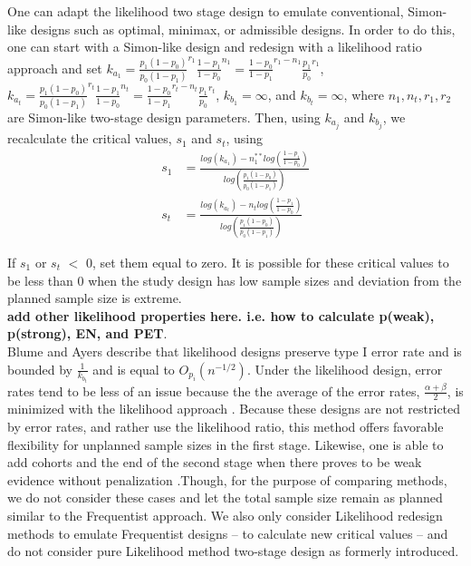 \documentclass[12pt]{report}\usepackage[]{graphicx}\usepackage[]{color}
\newlength{\li}\setlength{\li}{14.48pt}
\begin{document}
\indent One can adapt the likelihood two stage design to emulate conventional, Simon-like designs such as optimal, minimax, or admissible designs. In order to do this, one can start with a Simon-like design and redesign with a likelihood ratio approach and set $k_{a_1} = \frac{p_1(1-p_0)}{p_0(1-p_1)}^{r_1} \frac{1-p_1}{1-p_0}^{n_1} = \frac{1-p_0}{1-p_1}^{r_1-n_1}\frac{p_1}{p_0}^{r_1}$, $k_{a_t}  = \frac{p_1(1-p_0)}{p_0(1-p_1)}^{r_t} \frac{1-p_1}{1-p_0}^{n_t} = \frac{1-p_0}{1-p_1}^{r_t-n_t}\frac{p_1}{p_0}^{r_t}$, $k_{b_1} = \infty$, and $k_{b_t} = \infty$, where $n_1, n_t, r_1, r_2$ are Simon-like two-stage design parameters. Then, using $k_{a_j}$ and $k_{b_j}$, we recalculate the critical values, $s_1$ and $s_t$, using
\begin{equation*}
\begin{aligned}
s_1 &= \frac{log(k_{a_1}) - n_1^{\ast\ast} log(\frac{1-p_1}{1-p_0})}{log(\frac{p_1(1-p_0)}{p_0(1-p_1)})} \\
s_t &= \frac{log(k_{a_t}) - n_t log(\frac{1-p_1}{1-p_0})}{log(\frac{p_1(1-p_0)}{p_0(1-p_1)})}
\end{aligned}
\end{equation*}

If $s_1$ or $s_t$ $<$ 0, set them equal to zero. It is possible for these critical values to be less than 0 when the study design has low sample sizes and deviation from the planned sample size is extreme. \\
\textbf{add other likelihood properties here. i.e. how to calculate p(weak), p(strong), EN, and PET}. \\
\indent Blume and Ayers describe that likelihood designs preserve type I error rate and is bounded by $\frac{1}{k_{b_t}}$ and is equal to $O_{p_i}\left({n}^{-1/2}\right)$. Under the likelihood design, error rates tend to be less of an issue because the the average of the error rates, $\frac{\alpha + \beta}{2}$, is minimized with the likelihood approach \cite{Blume}. Because these designs are not restricted by error rates, and rather use the likelihood ratio, this method offers favorable flexibility for unplanned sample sizes in the first stage. Likewise, one is able to add cohorts and the end of the second stage when there proves to be weak evidence without penalization .Though, for the purpose of comparing methods, we do not consider these cases and let the total sample size remain as planned similar to the Frequentist approach. We also only consider Likelihood redesign methods to emulate Frequentist designs -- to calculate new critical values -- and do not consider pure Likelihood method two-stage design as formerly introduced. 
\end{document}
